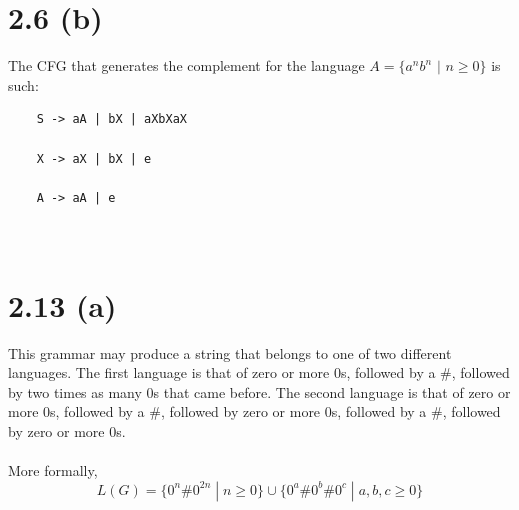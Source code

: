 \documentclass{article}
\begin{document}
\newpage

\section*{2.6 (b)}
The CFG that generates the complement for the language $A = \{a^nb^n$ $\mid$ $n \geq 0\}$ is such:
    
\begin{center}
    
    \begin{lstlisting}
    S -> aA | bX | aXbXaX
    
    X -> aX | bX | e
    
    A -> aA | e
    
    
    \end{lstlisting}
    
\end{center}

\section*{2.13 (a)}

This grammar may produce a string that belongs to one of two different languages. The first language is that of zero or more $0$s, followed by a $\#$, followed by two times as many $0$s that came before. The second language is that of zero or more $0$s, followed by a $\#$, followed by zero or more $0$s, followed by a $\#$, followed by zero or more $0$s.\\\\
More formally,
$$L(G) = \{ 0^n\#0^{2n} \; | \; n \geq 0 \} \cup  \{ 0^a\#0^b\#0^c \; | \; a,b,c \geq 0 \}$$
\end{document}
